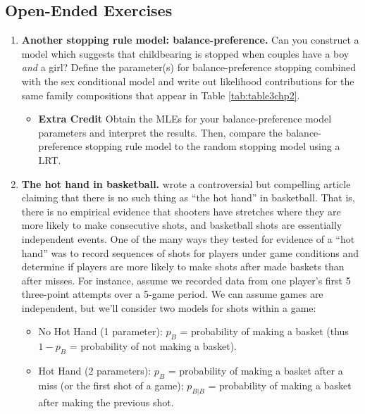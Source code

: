 \documentclass[
]{krantz}
\providecommand{\tightlist}{%
  \setlength{\itemsep}{0pt}\setlength{\parskip}{0pt}}
\begin{document}
\hypertarget{open-ended-exercises-1}{%
\subsection{Open-Ended Exercises}\label{open-ended-exercises-1}}

\begin{enumerate}
\def\labelenumi{\arabic{enumi}.}
\item
  \textbf{Another stopping rule model: balance-preference.}
  Can you construct a model which suggests that childbearing is stopped when couples have a boy \emph{and} a girl? Define the parameter(s) for balance-preference stopping combined with the sex conditional model and write out likelihood contributions for the same family compositions that appear in Table \ref{tab:table3chp2}.

  \begin{itemize}
  \tightlist
  \item
    \textbf{Extra Credit} Obtain the MLEs for your balance-preference model parameters and interpret the results. Then, compare the balance-preference stopping rule model to the random stopping model using a LRT.
  \end{itemize}
\item
  \textbf{The hot hand in basketball.} \citet{Gilovich1985} wrote a controversial but compelling article claiming that there is no such thing as ``the hot hand'' in basketball. That is, there is no empirical evidence that shooters have stretches where they are more likely to make consecutive shots, and basketball shots are essentially independent events. One of the many ways they tested for evidence of a ``hot hand'' was to record sequences of shots for players under game conditions and determine if players are more likely to make shots after made baskets than after misses. For instance, assume we recorded data from one player's first 5 three-point attempts over a 5-game period. We can assume games are independent, but we'll consider two models for shots within a game:

  \begin{itemize}
  \item
    No Hot Hand (1 parameter): \(p_B\) = probability of making a basket (thus \(1-p_B\) = probability of not making a basket).
  \item
    Hot Hand (2 parameters): \(p_B\) = probability of making a basket after a miss (or the first shot of a game); \(p_{B|B}\) = probability of making a basket after making the previous shot.
  \end{itemize}


\end{enumerate}
\end{document}
